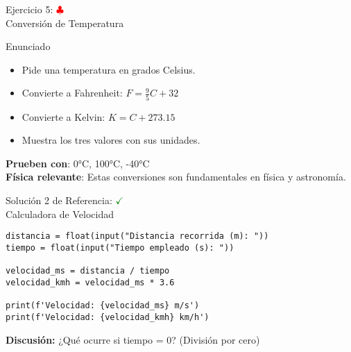 \documentclass[10pt]{beamer}
\begin{document}
\begin{frame}{Ejercicio 5: \hfill \textcolor{red}{$\clubsuit$} \\ Conversión de Temperatura}
  \begin{block}{Enunciado}
    \begin{itemize}
      \item Pide una temperatura en grados Celsius.
      \item Convierte a Fahrenheit: \(F = \frac{9}{5}C + 32\)
      \item Convierte a Kelvin: \(K = C + 273.15\)
      \item Muestra los tres valores con sus unidades.
    \end{itemize}
  \end{block}
  
  \textbf{Prueben con}: 0°C, 100°C, -40°C
  \\
  \textbf{Física relevante}: Estas conversiones son fundamentales en física y astronomía.
\end{frame}



\begin{frame}[fragile]{Solución 2 de Referencia: \hfill \textcolor{green}{$\checkmark$} \\ Calculadora de Velocidad}
\begin{verbatim}
distancia = float(input("Distancia recorrida (m): "))
tiempo = float(input("Tiempo empleado (s): "))

velocidad_ms = distancia / tiempo
velocidad_kmh = velocidad_ms * 3.6

print(f'Velocidad: {velocidad_ms} m/s')
print(f'Velocidad: {velocidad_kmh} km/h')
\end{verbatim}
\textbf{Discusión:} ¿Qué ocurre si tiempo = 0? (División por cero)
\end{frame}
\end{document}
